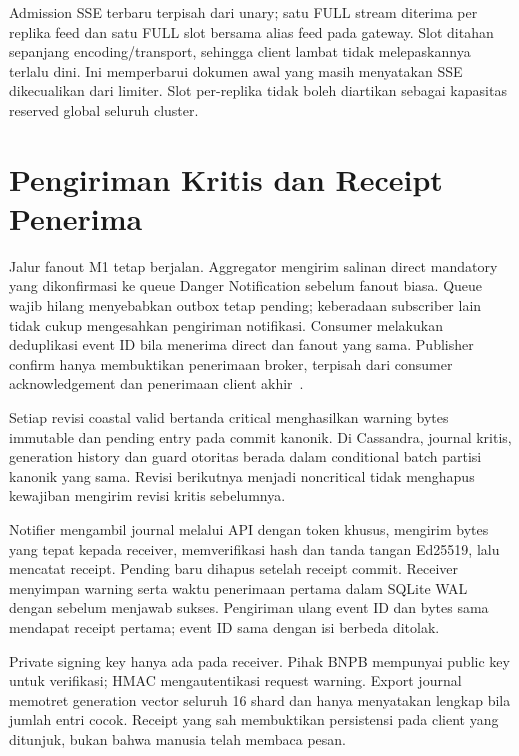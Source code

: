 Admission SSE terbaru terpisah dari unary; satu FULL stream diterima per replika feed dan satu FULL slot bersama alias feed pada gateway. Slot ditahan sepanjang encoding/transport, sehingga client lambat tidak melepaskannya terlalu dini. Ini memperbarui dokumen awal yang masih menyatakan SSE dikecualikan dari limiter. Slot per-replika tidak boleh diartikan sebagai kapasitas reserved global seluruh cluster.

\section{Pengiriman Kritis dan Receipt Penerima}
Jalur fanout M1 tetap berjalan. Aggregator mengirim salinan direct mandatory yang dikonfirmasi ke queue Danger Notification sebelum fanout biasa. Queue wajib hilang menyebabkan outbox tetap pending; keberadaan subscriber lain tidak cukup mengesahkan pengiriman notifikasi. Consumer melakukan deduplikasi event ID bila menerima direct dan fanout yang sama. Publisher confirm hanya membuktikan penerimaan broker, terpisah dari consumer acknowledgement dan penerimaan client akhir~\cite{rabbit}.

Setiap revisi coastal valid bertanda critical menghasilkan warning bytes immutable dan pending entry pada commit kanonik. Di Cassandra, journal kritis, generation history dan guard otoritas berada dalam conditional batch partisi kanonik yang sama. Revisi berikutnya menjadi noncritical tidak menghapus kewajiban mengirim revisi kritis sebelumnya.

Notifier mengambil journal melalui API dengan token khusus, mengirim bytes yang tepat kepada receiver, memverifikasi hash dan tanda tangan Ed25519, lalu mencatat receipt. Pending baru dihapus setelah receipt commit. Receiver menyimpan warning serta waktu penerimaan pertama dalam SQLite WAL dengan  sebelum menjawab sukses. Pengiriman ulang event ID dan bytes sama mendapat receipt pertama; event ID sama dengan isi berbeda ditolak.

Private signing key hanya ada pada receiver. Pihak BNPB mempunyai public key untuk verifikasi; HMAC mengautentikasi request warning. Export journal memotret generation vector seluruh 16 shard dan hanya menyatakan lengkap bila jumlah entri cocok. Receipt yang sah membuktikan persistensi pada client yang ditunjuk, bukan bahwa manusia telah membaca pesan.

